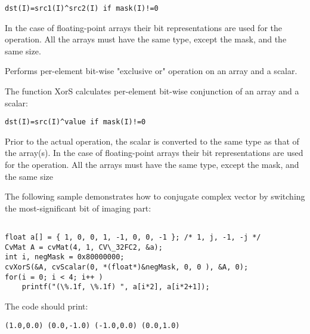 \begin{lstlisting}
dst(I)=src1(I)^src2(I) if mask(I)!=0
\end{lstlisting}

In the case of floating-point arrays their bit representations are used for the operation. All the arrays must have the same type, except the mask, and the same size.

Performs per-element bit-wise "exclusive or" operation on an array and a scalar.


\begin{description}
\end{description}


The function XorS calculates per-element bit-wise conjunction of an array and a scalar:

\begin{lstlisting}
dst(I)=src(I)^value if mask(I)!=0
\end{lstlisting}

Prior to the actual operation, the scalar is converted to the same type as that of the array(s). In the case of floating-point arrays their bit representations are used for the operation. All the arrays must have the same type, except the mask, and the same size

\ifC
The following sample demonstrates how to conjugate complex vector by switching the most-significant bit of imaging part:

\begin{lstlisting}

float a[] = { 1, 0, 0, 1, -1, 0, 0, -1 }; /* 1, j, -1, -j */
CvMat A = cvMat(4, 1, CV\_32FC2, &a);
int i, negMask = 0x80000000;
cvXorS(&A, cvScalar(0, *(float*)&negMask, 0, 0 ), &A, 0);
for(i = 0; i < 4; i++ )
    printf("(\%.1f, \%.1f) ", a[i*2], a[i*2+1]);

\end{lstlisting}

The code should print:

\begin{lstlisting}
(1.0,0.0) (0.0,-1.0) (-1.0,0.0) (0.0,1.0)
\end{lstlisting}
\fi

